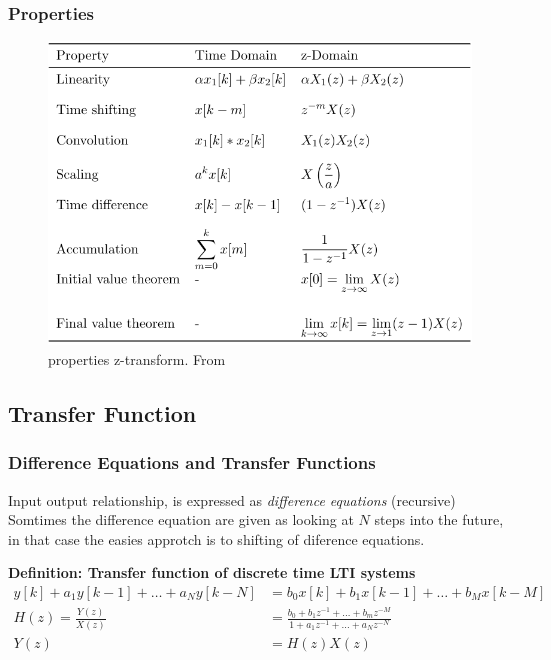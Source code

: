 \subsubsection{Properties}
\begin{figure}[H]
    \centering
    \includegraphics[width=12cm]{image/properties_z-transform.png}
    \caption{properties z-transform. From \cite{st}}
    \label{fig:properties_z-transform}
\end{figure}


\subsection{Transfer Function}
\subsubsection{Difference Equations and Transfer Functions}
Input output relationship, is expressed as \textit{difference equations} (recursive)
Somtimes the difference equation are given as looking at $N$ steps into 
the future, in that case the easies approtch is to shifting of diference equations.

\textbf{Definition: Transfer function of discrete time LTI systems}
\begin{align*}
    y[k]+a_1y[k-1]+\ldots+a_N y[k-N] &= b_0 x[k]+b_1 x[k-1]+\ldots+b_M x[k-M] \\ 
    H(z) = \frac{Y(z)}{X(z)} &= \frac{b_0+b_1z^{-1}+\ldots+b_mz^{-M}}{1+a_1z^{-1}+\ldots+a_Nz^{-N}} \\
    Y(z) &= H(z)X(z)
\end{align*}


